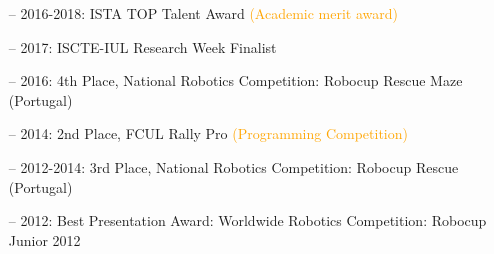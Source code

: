 \documentclass[10pt,a4paper]{altacv}
\begin{document}
\divider

%






\begin{itemize}
\setlength{\itemindent}{0.5em}
    \item[--]   \small{2016-2018: ISTA TOP Talent Award \textcolor{orange}{(Academic merit award)}}
    \item[--]   \small{2017: ISCTE-IUL Research Week Finalist}
     \item[--]   \small{2016: 4th Place, National Robotics Competition: Robocup Rescue Maze (Portugal)}
    \item[--]   \small{2014: 2nd Place, FCUL Rally Pro \textcolor{orange}{(Programming Competition)}}
    \item[--]   \small{2012-2014: 3rd Place, National Robotics Competition: Robocup Rescue (Portugal)}
  \item[--]   \small{2012: Best Presentation Award: Worldwide Robotics Competition: Robocup Junior 2012}
\end{itemize}
  








\end{document}
